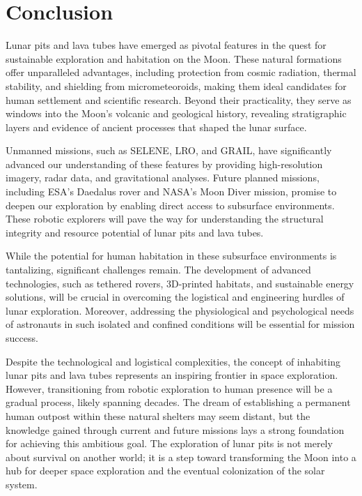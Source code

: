 \section{Conclusion}

Lunar pits and lava tubes have emerged as pivotal features in the quest for sustainable exploration and habitation on the Moon. These natural formations offer unparalleled advantages, including protection from cosmic radiation, thermal stability, and shielding from micrometeoroids, making them ideal candidates for human settlement and scientific research. Beyond their practicality, they serve as windows into the Moon’s volcanic and geological history, revealing stratigraphic layers and evidence of ancient processes that shaped the lunar surface.

Unmanned missions, such as SELENE, LRO, and GRAIL, have significantly advanced our understanding of these features by providing high-resolution imagery, radar data, and gravitational analyses. Future planned missions, including ESA's Daedalus rover and NASA's Moon Diver mission, promise to deepen our exploration by enabling direct access to subsurface environments. These robotic explorers will pave the way for understanding the structural integrity and resource potential of lunar pits and lava tubes.

While the potential for human habitation in these subsurface environments is tantalizing, significant challenges remain. The development of advanced technologies, such as tethered rovers, 3D-printed habitats, and sustainable energy solutions, will be crucial in overcoming the logistical and engineering hurdles of lunar exploration. Moreover, addressing the physiological and psychological needs of astronauts in such isolated and confined conditions will be essential for mission success.

Despite the technological and logistical complexities, the concept of inhabiting lunar pits and lava tubes represents an inspiring frontier in space exploration. However, transitioning from robotic exploration to human presence will be a gradual process, likely spanning decades. The dream of establishing a permanent human outpost within these natural shelters may seem distant, but the knowledge gained through current and future missions lays a strong foundation for achieving this ambitious goal. The exploration of lunar pits is not merely about survival on another world; it is a step toward transforming the Moon into a hub for deeper space exploration and the eventual colonization of the solar system.
